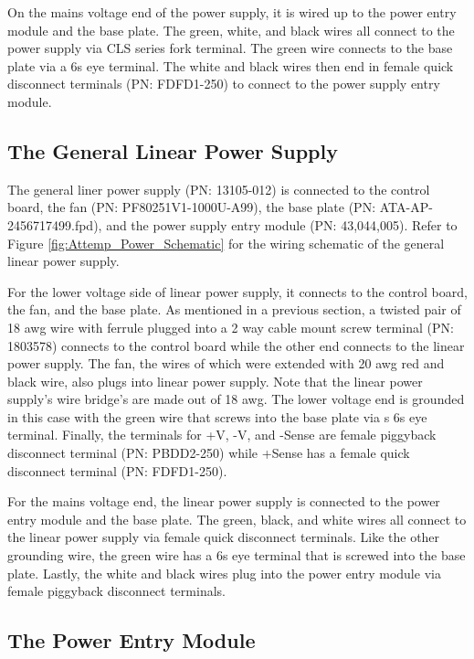 \documentclass[12pt,a4paper,oneside]{article}
\begin{document}
On the mains voltage end of the power supply, it is wired up to the power entry module and the base plate. The green, white, and black wires all connect to the power supply via CLS series fork terminal. The green wire connects to the base plate via a 6s  eye terminal. The white and black wires then end in female quick disconnect terminals (PN: FDFD1-250) to connect to the power supply entry module.

\subsection{The General Linear Power Supply}
\label{sec:6.5}

The general liner power supply (PN: 13105-012) is connected to the control board, the fan (PN: PF80251V1-1000U-A99), the base plate (PN: ATA-AP-2456717499.fpd), and the power supply entry module (PN: 43,044,005). Refer to Figure \ref{fig:Attemp_Power_Schematic} for the wiring schematic of the general linear power supply. 

For the lower voltage side of linear power supply, it connects to the control board, the fan, and the base plate. As mentioned in a previous section, a twisted pair of 18 awg wire with ferrule plugged into a 2 way cable mount screw terminal (PN: 1803578) connects to the control board while the other end connects to the linear power supply. The fan, the wires of which were extended with 20 awg red and black wire, also plugs into linear power supply. Note that the linear power supply's wire bridge's are made out of 18 awg. The lower voltage end is grounded in this case with the green wire that screws into the base plate via s 6s eye terminal. Finally, the terminals for +V, -V, and -Sense are female piggyback disconnect terminal (PN: PBDD2-250) while +Sense has a female quick disconnect terminal (PN: FDFD1-250).

For the mains voltage end, the linear power supply is connected to the power entry module and the base plate. The green, black, and white wires all connect to the linear power supply via female quick disconnect terminals. Like the other grounding wire, the green wire has a 6s eye terminal that is screwed into the base plate. Lastly, the white and black wires plug into the power entry module via female piggyback disconnect terminals.

\subsection{The Power Entry Module}
\label{sec:6.5}
\end{document}
